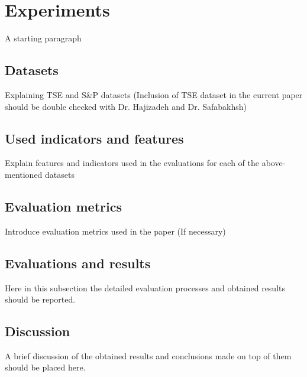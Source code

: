 \documentclass[12pt,journal,compsoc]{IEEEtran}
\begin{document}
\section{Experiments}
A starting paragraph

\subsection{Datasets}
Explaining TSE and S\&P datasets (Inclusion of TSE dataset in the current paper should be double checked with Dr. Hajizadeh and Dr. Safabakhsh)


\subsection{Used indicators and features}
Explain features and indicators used in the evaluations for each of the above-mentioned datasets


\subsection{Evaluation metrics}
Introduce evaluation metrics used in the paper (If necessary)

\subsection{Evaluations and results}
Here in this subsection the detailed evaluation processes and obtained results should be reported.

\subsection{Discussion}

A brief discussion of the obtained results and conclusions made on top of them should be placed here.





%
%
\end{document}
